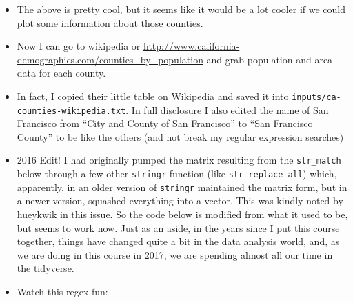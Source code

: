 \documentclass[]{book}
\providecommand{\tightlist}{%
  \setlength{\itemsep}{0pt}\setlength{\parskip}{0pt}}
\theoremstyle{definition}
\theoremstyle{definition}
\theoremstyle{remark}
\begin{document}
\begin{itemize}
\tightlist
\item
  The above is pretty cool, but it seems like it would be a lot cooler
  if we could plot some information about those counties.\\
\item
  Now I can go to wikipedia or
  \url{http://www.california-demographics.com/counties_by_population}
  and grab population and area data for each county.
\item
  In fact, I copied their little table on Wikipedia and saved it into
  \texttt{inputs/ca-counties-wikipedia.txt}. In full disclosure I also
  edited the name of San Francisco from ``City and County of San
  Francisco'' to ``San Francisco County'' to be like the others (and not
  break my regular expression searches)
\item
  2016 Edit! I had originally pumped the matrix resulting from the
  \texttt{str\_match} below through a few other \texttt{stringr}
  function (like \texttt{str\_replace\_all}) which, apparently, in an
  older version of \texttt{stringr} maintained the matrix form, but in a
  newer version, squashed everything into a vector. This was kindly
  noted by hueykwik
  \href{https://github.com/eriqande/rep-res-course/issues/74}{in this
  issue}. So the code below is modified from what it used to be, but
  seems to work now. Just as an aside, in the years since I put this
  course together, things have changed quite a bit in the data analysis
  world, and, as we are doing in this course in 2017, we are spending
  almost all our time in the \href{http://r4ds.had.co.nz/}{tidyverse}.
\item
  Watch this regex fun:
\end{itemize}
\end{document}
